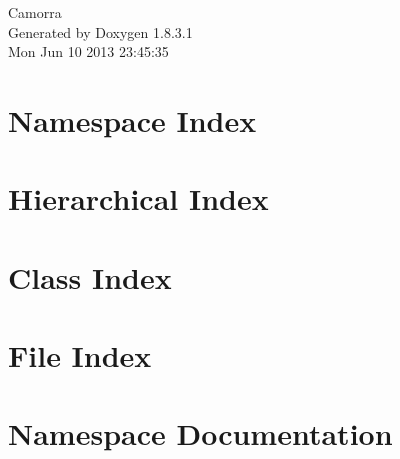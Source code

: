 \documentclass{book}
\begin{document}
\hypersetup{pageanchor=false,citecolor=blue}
\begin{titlepage}
\vspace*{7cm}
\begin{center}
{\Large Camorra }\\
\vspace*{1cm}
{\large Generated by Doxygen 1.8.3.1}\\
\vspace*{0.5cm}
{\small Mon Jun 10 2013 23:45:35}\\
\end{center}
\end{titlepage}
\clearemptydoublepage
{}
\tableofcontents
\clearemptydoublepage
{}
\hypersetup{pageanchor=true,citecolor=blue}
\chapter{Namespace Index}

\chapter{Hierarchical Index}

\chapter{Class Index}

\chapter{File Index}

\chapter{Namespace Documentation}


\end{document}
